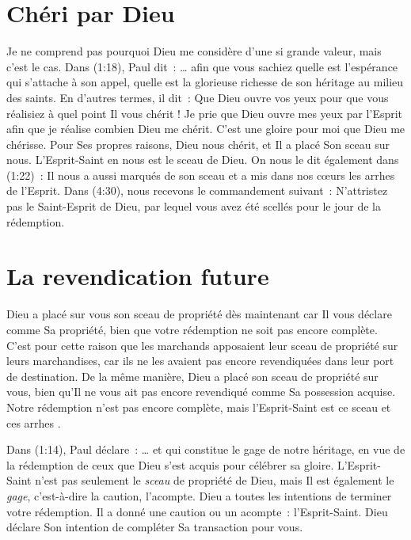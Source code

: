 \section*{Chéri par Dieu}

Je ne comprend pas pourquoi Dieu me considère d'une si grande valeur,
 mais c'est le cas.
 Dans (1:18), Paul dit~:
 \og \dots{} afin que vous sachiez quelle est l'espérance
 qui s'attache à son appel, quelle est la glorieuse richesse
 de son héritage au milieu des saints. \fg{}
 En d'autres termes, il dit~:
 \og Que Dieu ouvre vos yeux pour que vous réalisiez
 à quel point Il vous chérit ! \fg{}
 Je prie que Dieu ouvre mes yeux par l'Esprit afin que je réalise
 combien Dieu me chérit. C'est une gloire pour moi que Dieu me chérisse.
 Pour Ses propres raisons, Dieu nous chérit,
 et Il a placé Son sceau sur nous.
 L'Esprit-Saint en nous est le sceau de Dieu.
 On nous le dit également dans (1:22)~:
 \og Il nous a aussi marqués de son sceau et a mis dans nos cœurs
 les arrhes de l'Esprit. \fg{}
 Dans (4:30), nous recevons le commandement suivant~:
 \og N'attristez pas le Saint-Esprit de Dieu, par lequel
 vous avez été scellés pour le jour de la rédemption. \fg{}


\section*{La revendication future}

Dieu a placé sur vous son sceau de propriété dès maintenant
 car Il vous déclare comme Sa propriété, bien que votre rédemption
 ne soit pas encore complète.
 C'est pour cette raison que les marchands apposaient leur sceau de propriété
 sur leurs marchandises, car ils ne les avaient pas encore revendiquées
 dans leur port de destination.
 De la même manière, Dieu a placé son sceau de propriété sur vous,
 bien qu'Il ne vous ait pas encore revendiqué comme Sa possession acquise.
 Notre rédemption n'est pas encore complète,
 mais l'Esprit-Saint est ce sceau et \og ces arrhes \fg{}.

Dans (1:14), Paul déclare~:
 \og \dots{} et qui constitue le gage de notre héritage,
 en vue de la rédemption de ceux que Dieu s'est acquis
 pour célébrer sa gloire. \fg{}
 L'Esprit-Saint n'est pas seulement le \emph{sceau} de propriété de Dieu,
 mais Il est également le \emph{gage}, c'est-à-dire la caution, l'acompte.
 Dieu a toutes les intentions de terminer votre rédemption.
 Il a donné une caution ou un acompte~: l'Esprit-Saint.
 Dieu déclare Son intention de compléter Sa transaction pour vous.

